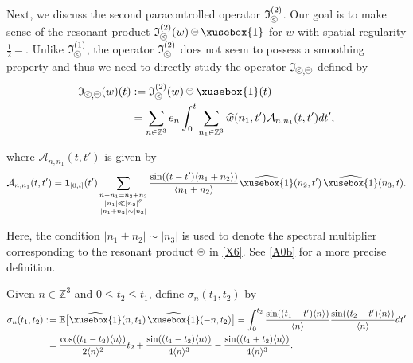 \documentclass[%
11pt,  reqno]{amsart}
\def\<#1>{\xusebox{#1}}
\newcommand{\pe}{\mathbin{\scaleobj{0.7}{\tikz \draw (0,0) node[shape=circle,draw,inner sep=0pt,minimum size=8.5pt] {\scriptsize  $=$};}}}
\newcommand{\pl}{\mathbin{\scaleobj{0.7}{\tikz \draw (0,0) node[shape=circle,draw,inner sep=0pt,minimum size=8.5pt] {\scriptsize $<$};}}}
\newcommand{\1}{\hspace{0.2mm}\text{I}\hspace{0.2mm}}
\newcommand{\noi}{\noindent}
\newcommand{\Z}{\mathbb{Z}}
\newcommand{\E}{\mathbb{E}}
\newcommand{\s}{\sigma}
\newcommand{\ft}{\widehat}
\newcommand{\jb}[1]
{\langle #1 \rangle}
\newcommand{\ind}{\mathbf 1}
\newcommand{\If}{\mathfrak{I}}
\newcommand{\A}{\mathcal{A}}
\numberwithin{equation}{section}
\numberwithin{theorem}{section}
\begin{document}
Next, we discuss the second paracontrolled operator $ \If_{\pl}^{(2)}$.
Our goal is to make sense of the resonant product
$  \If_{\pl}^{(2)}(w)\pe\<1>$
for $w$ with spatial regularity $\frac 12-$.
Unlike $ \If_{\pl}^{(1)}$, 
the operator  $ \If_{\pl}^{(2)}$ does not seem to possess a smoothing property
and thus we need to directly study the  operator $\If_{\pl, \pe}$ defined by
\begin{align}
\begin{split}
\If_{\pl, \pe}(w) (t)
 & :=
  \If_{\pl}^{(2)}(w)\pe\<1>(t) \\
&  = \sum_{n \in \Z^3}e_n 
    \int_0^{t} 
\sum_{n_1 \in \Z^3}
\ft w(n_1, t') \A_{n, n_1} (t, t') dt', 
\end{split}
\label{X6}
\end{align}

\noi
where $\A_{n, n_1} (t, t')$ is given by 
\begin{align}
\A_{n, n_1} (t, t')
= \ind_{[0 , t]}(t') \sum_{\substack{n - n_1 =  n_2 + n_3\\ |n_1| \ll |n_2|^\theta \\ |n_1 + n_2|\sim |n_3|}}
 \frac{\sin ((t - t') \jb{n_1 + n_2 })}{\jb{ n_1 + n_2 }} 
   \ft{\<1>}(n_2, t')\,   \ft{\<1>}(n_3, t) .
\label{X7}
\end{align}

\noi
Here, 
the condition  $ |n_1 + n_2|\sim |n_3|$
is used to denote the  spectral multiplier corresponding 
to the resonant product $\pe$ in \eqref{X6}.
See \eqref{A0b} for a more precise  definition.

Given $n \in \Z^3$ and  $0 \leq t_2\leq t_1$, 
define $\s_{n}(t_1, t_2 )$ by 
\begin{align}
\begin{split}
\s_{n}(t_1, t_2 )   : \! & =
\E  \big[  \ft{\<1>}(n, t_1)  \,  \ft{\<1>}(-n, t_2) \big]
  =
   \int_0^{t_2} \frac{\sin ((t_1 - t')\jb{n} )}{\jb{n}}
   \frac{\sin ((t_2 - t') \jb{n})}{\jb{n}} d t'\\
&  =    \frac{\cos((t_1 - t_2)\jb{n}) }{2 \jb{n}^2} t_2
+  \frac{\sin ((t_1-t_2)  \jb{n})}{4\jb{n}^3 }
-  \frac{\sin ((t_1 +  t_2) \jb{n})}{4\jb{n}^3 }.
\end{split}
\label{sigma2}
\end{align}
\end{document}
